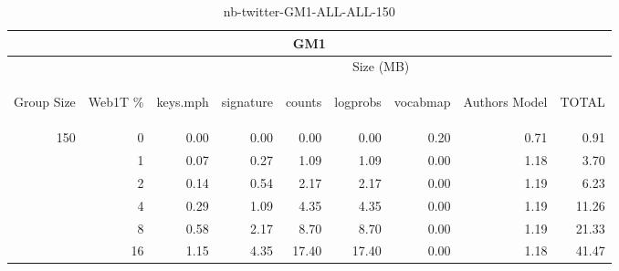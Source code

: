 \begin{center}
\begin{table}[htbp] 
 \begin{center}
\begin{tabular}{ | r | r | r | r | r | r | r | r | r |}
\hline
\multicolumn{9}{|c|}{GM1}\\
\hline
 & & \multicolumn{7}{|c|}{Size (MB)}\\ \cline{3-9}
\begin{sideways}Group Size\end{sideways} & \begin{sideways}Web1T \% \end{sideways} & \begin{sideways}keys.mph\end{sideways} & \begin{sideways}signature\end{sideways} & \begin{sideways}counts\end{sideways} & \begin{sideways}logprobs\end{sideways} & \begin{sideways}vocabmap\end{sideways} & \begin{sideways}Authors Model \end{sideways} & \begin{sideways}TOTAL\end{sideways}\\
\hline
\multirow{5}{*}{150}
 & 0 & 0.00 & 0.00 & 0.00 & 0.00 & 0.20 & 0.71 & 0.91\\ \cline{2-9}
 & 1 & 0.07 & 0.27 & 1.09 & 1.09 & 0.00 & 1.18 & 3.70\\ \cline{2-9}
 & 2 & 0.14 & 0.54 & 2.17 & 2.17 & 0.00 & 1.19 & 6.23\\ \cline{2-9}
 & 4 & 0.29 & 1.09 & 4.35 & 4.35 & 0.00 & 1.19 & 11.26\\ \cline{2-9}
 & 8 & 0.58 & 2.17 & 8.70 & 8.70 & 0.00 & 1.19 & 21.33\\ \cline{2-9}
 & 16 & 1.15 & 4.35 & 17.40 & 17.40 & 0.00 & 1.18 & 41.47\\ \cline{2-9}
\hline
\end{tabular}
\caption{nb-twitter-GM1-ALL-ALL-150}
\label{table:nb-twitter-GM1-ALL-ALL-150}
\end{center}
 \end{table}
\end{center}

